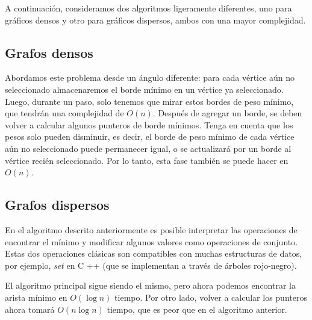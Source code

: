 A continuación, consideramos dos algoritmos ligeramente diferentes, uno para gráficos densos y otro para gráficos dispersos, ambos con una mayor complejidad.


\subsection{Grafos densos}

Abordamos este problema desde un ángulo diferente: para cada vértice aún no seleccionado almacenaremos el borde mínimo en un vértice ya seleccionado. Luego, durante un paso, solo tenemos que mirar estos bordes de peso mínimo, que tendrán una complejidad de $O(n)$. Después de agregar un borde, se deben volver a calcular algunos punteros de borde mínimos. Tenga en cuenta que los pesos solo pueden disminuir, es decir, el borde de peso mínimo de cada vértice aún no seleccionado puede permanecer igual, o se actualizará por un borde al vértice recién seleccionado. Por lo tanto, esta fase también se puede hacer en $O(n)$.

\subsection{Grafos dispersos}

En el algoritmo descrito anteriormente es posible interpretar las operaciones de encontrar el mínimo y modificar algunos valores como operaciones de conjunto. Estas dos operaciones clásicas son compatibles con muchas estructuras de datos, por ejemplo, \emph{set} en C ++ (que se implementan a través de árboles rojo-negro).

El algoritmo principal sigue siendo el mismo, pero ahora podemos encontrar la arista mínimo en $O(\log n)$ tiempo. Por otro lado, volver a calcular los punteros ahora tomará $O(n\log n)$ tiempo, que es peor que en el algoritmo anterior.

